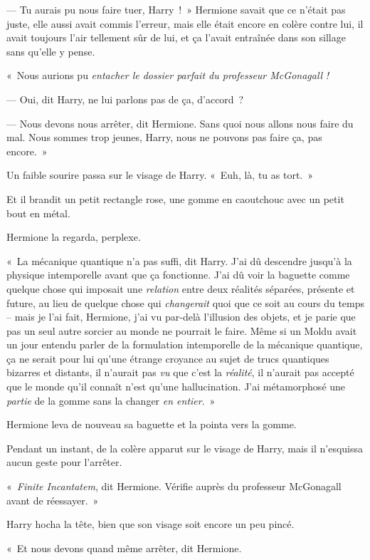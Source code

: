 --- Tu aurais pu nous faire tuer, Harry~!~» Hermione savait que ce n'était pas juste, elle aussi avait commis l'erreur, mais elle était encore en colère contre lui, il avait toujours l'air tellement sûr de lui, et ça l'avait entraînée dans son sillage sans qu'elle y pense.

«~Nous aurions pu \emph{entacher le dossier parfait du professeur McGonagall} \emph{!}

--- Oui, dit Harry, ne lui parlons pas de ça, d'accord~?

--- Nous devons nous arrêter, dit Hermione. Sans quoi nous allons nous faire du mal. Nous sommes trop jeunes, Harry, nous ne pouvons pas faire ça, pas encore.~»

Un faible sourire passa sur le visage de Harry. «~Euh, là, tu as tort.~»

Et il brandit un petit rectangle rose, une gomme en caoutchouc avec un petit bout en métal.

Hermione la regarda, perplexe.

«~La mécanique quantique n'a pas suffi, dit Harry. J'ai dû descendre jusqu'à la physique intemporelle avant que ça fonctionne. J'ai dû voir la baguette comme quelque chose qui imposait une \emph{relation} entre deux réalités séparées, présente et future, au lieu de quelque chose qui \emph{changerait} quoi que ce soit au cours du temps -- mais je l'ai fait, Hermione, j'ai vu par-delà l'illusion des objets, et je parie que pas un seul autre sorcier au monde ne pourrait le faire. Même si un Moldu avait un jour entendu parler de la formulation intemporelle de la mécanique quantique, ça ne serait pour lui qu'une étrange croyance au sujet de trucs quantiques bizarres et distants, il n'aurait pas \emph{vu} que c'est la \emph{réalité}, il n'aurait pas accepté que le monde qu'il connaît n'est qu'une hallucination. J'ai métamorphosé une \emph{partie} de la gomme sans la changer \emph{en entier}.~»

Hermione leva de nouveau sa baguette et la pointa vers la gomme.

Pendant un instant, de la colère apparut sur le visage de Harry, mais il n'esquissa aucun geste pour l'arrêter.

«~\emph{Finite Incantatem}, dit Hermione. Vérifie auprès du professeur McGonagall avant de réessayer.~»

Harry hocha la tête, bien que son visage soit encore un peu pincé.

«~Et nous devons quand même arrêter, dit Hermione.

